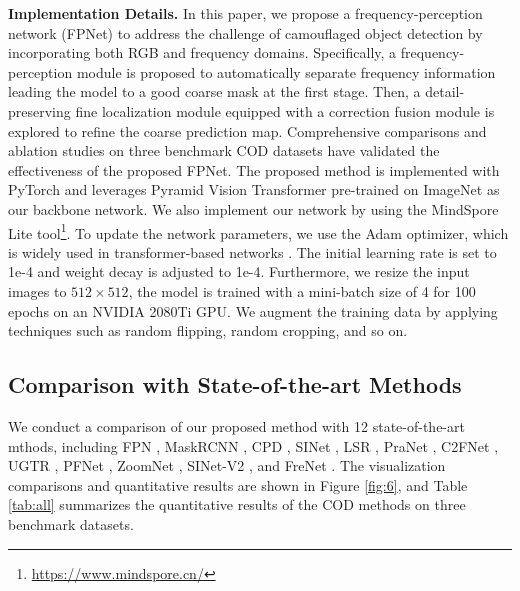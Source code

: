 \documentclass[sigconf,screen]{acmart}
\begin{document}
\noindent \textbf{Implementation Details. }
In this paper, we propose a frequency-perception network (FPNet) to address the challenge of camouflaged object detection by incorporating both RGB and frequency domains. Specifically, a frequency-perception module is proposed to automatically separate frequency information leading the model to a good coarse mask at the first stage. Then, a detail-preserving fine localization module equipped with a correction fusion module is explored to refine the coarse prediction map. Comprehensive comparisons and ablation studies on three benchmark COD datasets have validated the effectiveness of the proposed FPNet. 
The proposed method is implemented with PyTorch and leverages Pyramid Vision Transformer \cite{r19} pre-trained on ImageNet \cite{r49} as our backbone network. We also implement our network by using the MindSpore Lite tool\footnote{\url{https://www.mindspore.cn/}}. To update the network parameters, we use the Adam optimizer, which is widely used in transformer-based networks \cite{r19,r20,r21}. The initial learning rate is set to 1e-4 and weight decay is adjusted to 1e-4. Furthermore, we resize the input images to $512 \times 512$, the model is trained with a mini-batch size of 4 for 100 epochs on an NVIDIA 2080Ti GPU. 
We augment the training data by applying techniques such as random flipping, random cropping, and so on. 

\subsection {Comparison with State-of-the-art Methods}
We conduct a comparison of our proposed method with 12 state-of-the-art mthods, including FPN      \cite{r58}, MaskRCNN \cite{r59}, CPD \cite{r34}, SINet \cite{r7}, LSR \cite{r38}, PraNet \cite{r24}, C2FNet \cite{r52}, UGTR \cite{r17}, PFNet \cite{r15}, ZoomNet \cite{r55}, SINet-V2 \cite{r53}, and FreNet \cite{r39}. 
The visualization comparisons and quantitative results are shown in Figure \ref{fig:6}, and Table \ref{tab:all} summarizes the quantitative results of the COD methods on three benchmark datasets. 
\end{document}
